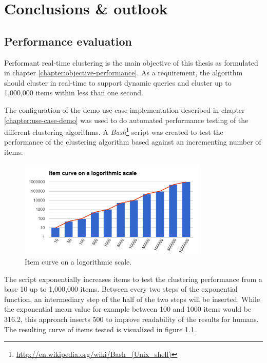 
%
%

\chapter{Conclusions \& outlook}
\label{chapter:conclusions-outlook}

\section{Performance evaluation}
\label{chapter:performance}

Performant real-time clustering is the main objective of this thesis as formulated in chapter \ref{chapter:objective-performance}. As a requirement, the algorithm should cluster in real-time to support dynamic queries and cluster up to 1,000,000 items within less than one second.

The configuration of the demo use case implementation described in chapter \ref{chapter:use-case-demo} was used to do automated performance testing of the different clustering algorithms. A \textit{Bash}\footnote{\url{http://en.wikipedia.org/wiki/Bash\_(Unix\_shell)}} script was created to test the performance of the clustering algorithm based against an incrementing number of items.

\begin{figure}[h]
  \begin{center}
    \includegraphics[width=0.8\textwidth]{figures/performance_items.pdf}
    \caption{Item curve on a logorithmic scale.}
    \label{fig:performance-items}
  \end{center}
\end{figure}

The script exponentially increases items to test the clustering performance from a base 10 up to 1,000,000 items. Between every two steps of the exponential function, an intermediary step of the half of the two steps will be inserted. While the exponential mean value for example between 100 and 1000 items would be 316.2, this approach inserts 500 to improve readability of the results for humans. The resulting curve of items tested is visualized in figure \ref{fig:performance-items}.

